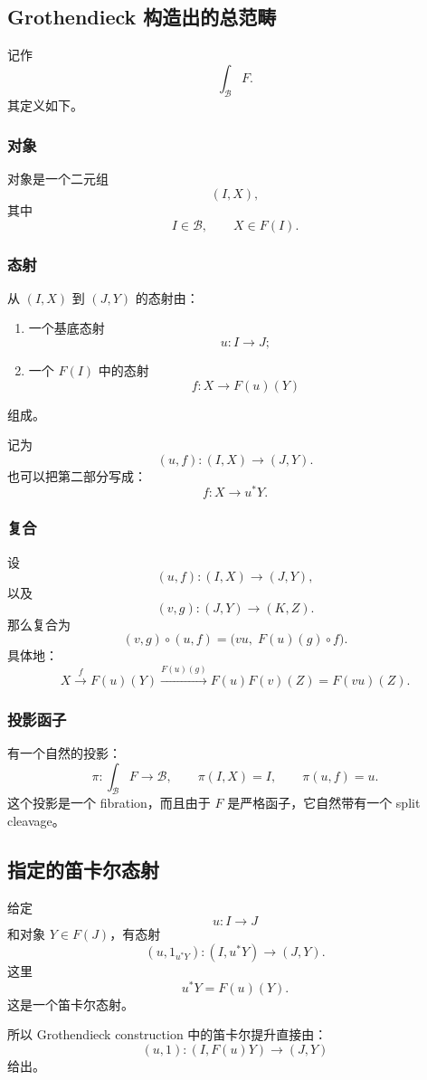 \documentclass[12pt,a4paper]{article}
\begin{document}
\subsection{Grothendieck 构造出的总范畴}

记作
\[
\int_{\mathcal{B}}F.
\]
其定义如下。

\subsubsection{对象}
对象是一个二元组
\[
(I,X),
\]
其中
\[
I\in\mathcal{B},
\qquad
X\in F(I).
\]

\subsubsection{态射}
从 \((I,X)\) 到 \((J,Y)\) 的态射由：
\begin{enumerate}
  \item 一个基底态射
  \[
  u:I\to J;
  \]
  \item 一个 \(F(I)\) 中的态射
  \[
  f:X\to F(u)(Y)
  \]
\end{enumerate}
组成。

记为
\[
(u,f):(I,X)\to(J,Y).
\]
也可以把第二部分写成：
\[
f:X\to u^*Y.
\]

\subsubsection{复合}
设
\[
(u,f):(I,X)\to(J,Y),
\]
以及
\[
(v,g):(J,Y)\to(K,Z).
\]
那么复合为
\[
(v,g)\circ(u,f)
=
\bigl(vu,\;F(u)(g)\circ f\bigr).
\]
具体地：
\[
X\xrightarrow{f}F(u)(Y)
\xrightarrow{F(u)(g)}F(u)F(v)(Z)
=
F(vu)(Z).
\]

\subsubsection{投影函子}
有一个自然的投影：
\[
\pi:\int_{\mathcal{B}}F\to\mathcal{B},
\qquad
\pi(I,X)=I,
\qquad
\pi(u,f)=u.
\]
这个投影是一个 fibration，而且由于 \(F\) 是严格函子，它自然带有一个 split cleavage。

\subsection{指定的笛卡尔态射}

给定
\[
u:I\to J
\]
和对象 \(Y\in F(J)\)，有态射
\[
(u,1_{u^*Y}):(I,u^*Y)\to(J,Y).
\]
这里
\[
u^*Y=F(u)(Y).
\]
这是一个笛卡尔态射。

所以 Grothendieck construction 中的笛卡尔提升直接由：
\[
(u,1):(I,F(u)Y)\to(J,Y)
\]
给出。
\end{document}
